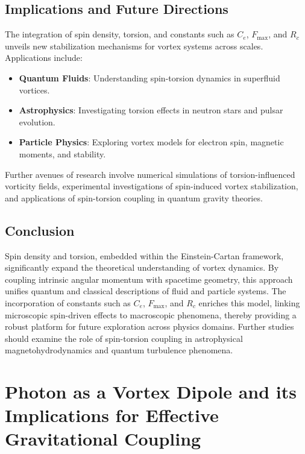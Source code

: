 \documentclass[a4paper,10pt]{article}
\begin{document}
\subsection*{Implications and Future Directions}


The integration of spin density, torsion, and constants such as $C_e$, $F_{\max}$, and $R_c$ unveils new stabilization mechanisms for vortex systems across scales. Applications include:


\begin{itemize}

\item \textbf{Quantum Fluids}: Understanding spin-torsion dynamics in superfluid vortices.

\item \textbf{Astrophysics}: Investigating torsion effects in neutron stars and pulsar evolution.

\item \textbf{Particle Physics}: Exploring vortex models for electron spin, magnetic moments, and stability.

\end{itemize}

Further avenues of research involve numerical simulations of torsion-influenced vorticity fields, experimental investigations of spin-induced vortex stabilization, and applications of spin-torsion coupling in quantum gravity theories.


\subsection*{Conclusion}


Spin density and torsion, embedded within the Einstein-Cartan framework, significantly expand the theoretical understanding of vortex dynamics. By coupling intrinsic angular momentum with spacetime geometry, this approach unifies quantum and classical descriptions of fluid and particle systems. The incorporation of constants such as $C_e$, $F_{\max}$, and $R_c$ enriches this model, linking microscopic spin-driven effects to macroscopic phenomena, thereby providing a robust platform for future exploration across physics domains. Further studies should examine the role of spin-torsion coupling in astrophysical magnetohydrodynamics and quantum turbulence phenomena.
    

    \section{Photon as a Vortex Dipole and its Implications for Effective Gravitational Coupling}
\end{document}
